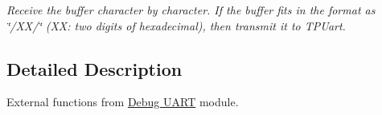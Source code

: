 \begin{DoxyCompactItemize}
\begin{DoxyCompactList}\small\item\em Receive the buffer character by character. If the buffer fits in the format as \char`\"{}/\+X\+X/\char`\"{} (XX\+: two digits of hexadecimal), then transmit it to T\+P\+Uart. \end{DoxyCompactList}\end{DoxyCompactItemize}


\subsection{Detailed Description}
External functions from \hyperlink{group___debug___uart}{Debug U\+A\+RT} module. 

